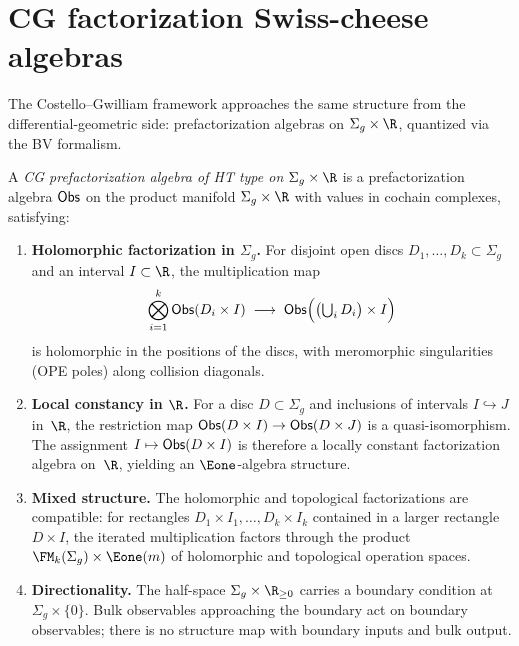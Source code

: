 \section{CG factorization Swiss-cheese algebras}
\label{sec:CG-factorization-SC}

The Costello--Gwilliam framework \cite{CG17} approaches the same
structure from the differential-geometric side: prefactorization
algebras on $\Sigma_g \times \R$, quantized via the BV formalism.

\begin{definition}
\label{def:CG-prefact}
A \emph{CG prefactorization algebra of HT type on
$\Sigma_g \times \R$} is a prefactorization algebra $\mathsf{Obs}$ on the
product manifold $\Sigma_g \times \R$ with values in cochain
complexes, satisfying:
\begin{enumerate}[label=\textup{(\roman*)}]
\item \textbf{Holomorphic factorization in $\Sigma_g$.} For
 disjoint open discs $D_1,\ldots,D_k \subset \Sigma_g$ and
 an interval $I \subset \R$, the multiplication map
 \[
 \bigotimes_{i=1}^k \mathsf{Obs}(D_i \times I)
 \;\longrightarrow\;
 \mathsf{Obs}\Bigl(\bigl(\textstyle\bigcup_i D_i\bigr) \times I\Bigr)
 \]
 is holomorphic in the positions of the discs, with meromorphic
 singularities (OPE poles) along collision diagonals.

\item \textbf{Local constancy in $\R$.} For a disc
 $D \subset \Sigma_g$ and inclusions of intervals
 $I \hookrightarrow J$ in~$\R$, the restriction map
 $\mathsf{Obs}(D \times I) \to \mathsf{Obs}(D \times J)$ is a
 quasi-isomorphism. The assignment $I \mapsto \mathsf{Obs}(D \times I)$
 is therefore a locally constant factorization algebra on~$\R$,
 yielding an $\Eone$-algebra structure.

\item \textbf{Mixed structure.} The holomorphic and topological
 factorizations are compatible: for rectangles
 $D_1 \times I_1, \ldots, D_k \times I_k$ contained in a larger
 rectangle $D \times I$, the iterated multiplication factors
 through the product $\FM_k(\Sigma_g) \times \Eone(m)$ of
 holomorphic and topological operation spaces.

\item \textbf{Directionality.} The half-space
 $\Sigma_g \times \R_{\geq 0}$ carries a boundary condition at
 $\Sigma_g \times \{0\}$. Bulk observables approaching the
 boundary act on boundary observables; there is no structure map
 with boundary inputs and bulk output.
\end{enumerate}
\end{definition}

